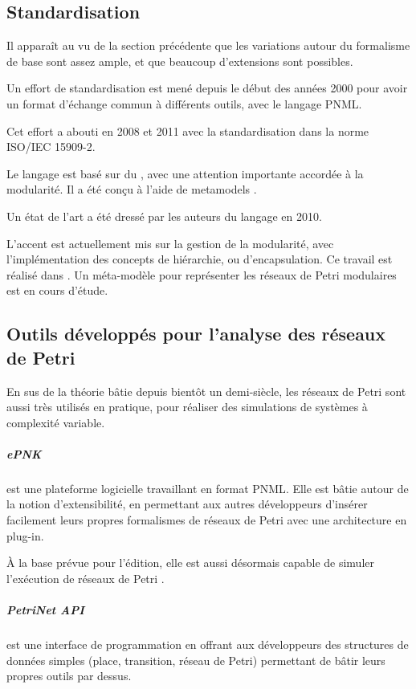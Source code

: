 \subsection{Standardisation}
Il apparaît au vu de la section précédente que les variations autour du formalisme de base sont assez ample, et que beaucoup d'extensions sont possibles.

Un effort de standardisation est mené depuis le début des années 2000 pour avoir un format d'échange commun à différents outils, avec le langage \ac{PNML}.

Cet effort a abouti en 2008 et 2011 avec la standardisation dans la norme ISO/IEC 15909-2.

Le langage est basé sur du , avec une attention importante accordée à la modularité. Il a été conçu à l'aide de \glspl{metamodel} .

Un état de l'art\cite{hillah2010standardisation} a été dressé par les auteurs du langage en 2010.

L'accent est actuellement mis sur la gestion de la modularité, avec l'implémentation des concepts de hiérarchie, ou d'encapsulation. Ce travail est réalisé dans . Un méta-modèle pour représenter les réseaux de Petri modulaires est en cours d'étude\cite{marechal2012modular}.

\subsection{Outils développés pour l'analyse des réseaux de Petri}
En sus de la théorie bâtie depuis bientôt un demi-siècle, les réseaux de Petri sont aussi très utilisés en pratique, pour réaliser des simulations de systèmes à complexité variable.

\subparagraph{ePNK} est une plateforme logicielle travaillant en format \ac{PNML}. Elle est bâtie autour de la notion d'extensibilité, en permettant aux autres développeurs d'insérer facilement leurs propres formalismes de réseaux de Petri avec une architecture en plug-in.

À la base prévue pour l'édition, elle est aussi désormais capable de simuler l'exécution de réseaux de Petri  \cite{kindler2013simulator}.

\subparagraph{PetriNet API} \cite{lohmann2009petri} est une interface de programmation en  offrant aux développeurs des structures de données simples (place, transition, réseau de Petri) permettant de bâtir leurs propres outils par dessus.

